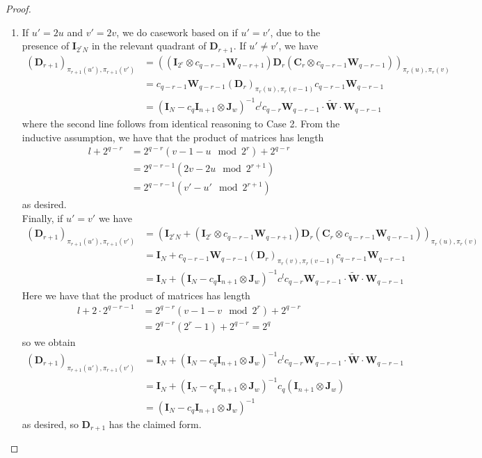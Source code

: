 \documentclass[11pt]{article}
\numberwithin{equation}{section}
\theoremstyle{definition}
\theoremstyle{plain}
\newcommand{\mC}{\mathbf{C}}
\newcommand{\mD}{\mathbf{D}}
\newcommand{\mW}{\mathbf{W}}
\newcommand{\I}{\mathbf{I}}
\newcommand{\Jw}{\mathbf{J}_w}
\begin{document}
\begin{proof}
\begin{enumerate}
    \item If $u'=2u$ and $v'=2v$, we do casework based on if $u'=v'$, due to the presence of $\I_{2^rN}$ in the relevant quadrant of $\mD_{r+1}$. If $u'\neq v'$, we have
    \begin{align*}
        (\mD_{r+1})_{\pi_{r+1}(u'),\pi_{r+1}(v')}
        &= ((\I_{2^r}\otimes c_{q-r-1}\mW_{q-r+1})\mD_{r}(\mC_{r} \otimes c_{q-r-1}\mW_{q-r-1}))_{\pi_r(u),\pi_r(v)}\\
        &=   c_{q-r-1}\mW_{q-r-1}(\mD_r)_{\pi_r(u),\pi_r(v-1)}c_{q-r-1}\mW_{q-r-1}\\
        &= (\I_N-c_q\I_{n+1}\otimes\Jw)^{-1}c^{l}c_{q-r}\mW_{q-r-1}\cdot \widetilde{\mW}\cdot \mW_{q-r-1}%
    \end{align*}
    where %
    the second line follows from identical reasoning to Case 2. From the inductive assumption, we have that the product of matrices has length 
    \begin{align*}
        l+2^{q-r}&=2^{q-r}(v-1-u \mod 2^{r})+2^{q-r}\\
        &=2^{q-r-1}(2v-2u \mod 2^{r+1})\\
        &=2^{q-r-1}(v'-u' \mod 2^{r+1})
    \end{align*}
    as desired.\\
    
    Finally, if $u'=v'$ we have 
     \begin{align*}
        (\mD_{r+1})_{\pi_{r+1}(u'),\pi_{r+1}(v')} &= (\I_{2^{r}N}+(\I_{2^r}\otimes c_{q-r-1}\mW_{q-r+1})\mD_{r}(\mC_{r} \otimes c_{q-r-1}\mW_{q-r-1}))_{\pi_r(u),\pi_r(v)}\\
        &= \I_N+c_{q-r-1}\mW_{q-r-1}(\mD_r)_{\pi_r(v),\pi_r(v-1)}c_{q-r-1}\mW_{q-r-1}\\
        &= \I_N+(\I_N-c_q\I_{n+1}\otimes\Jw)^{-1}c^{l}c_{q-r}\mW_{q-r-1}\cdot \widetilde{\mW}\cdot \mW_{q-r-1}
    \end{align*}
    Here we have that the product of matrices has length 
    \begin{align*}
        l+2\cdot 2^{q-r-1} &=2^{q-r}(v-1-v \mod 2^r)+ 2^{q-r}\\
        &=2^{q-r}(2^r-1)+2^{q-r}=2^q
    \end{align*} 
    so we obtain 
    \begin{align*}
        (\mD_{r+1})_{\pi_{r+1}(u'),\pi_{r+1}(v')} &= \I_N+(\I_N-c_q\I_{n+1}\otimes\Jw)^{-1}c^{l}c_{q-r}\mW_{q-r-1}\cdot \widetilde{\mW}\cdot \mW_{q-r-1}\\
        &= \I_N+(\I_N-c_q\I_{n+1}\otimes\Jw)^{-1}c_q(\I_{n+1}\otimes\Jw)\\
        &=(\I_N-c_q\I_{n+1}\otimes\Jw)^{-1}
    \end{align*}
    as desired, so $\mD_{r+1}$ has the claimed form.
\end{enumerate}


\end{proof}
\end{document}
